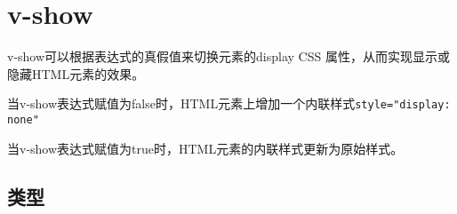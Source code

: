 \begin{lstlisting}[language=JavaScript]

\end{lstlisting}




\begin{lstlisting}[language=JavaScript]

\end{lstlisting}




\begin{lstlisting}[language=JavaScript]

\end{lstlisting}




\begin{lstlisting}[language=JavaScript]

\end{lstlisting}




\begin{lstlisting}[language=JavaScript]

\end{lstlisting}




\begin{lstlisting}[language=JavaScript]

\end{lstlisting}




\begin{lstlisting}[language=JavaScript]

\end{lstlisting}

\chapter{v-show}

v-show可以根据表达式的真假值来切换元素的display CSS 属性，从而实现显示或隐藏HTML元素的效果。

\begin{compactitem}
\item 当v-show表达式赋值为false时，HTML元素上增加一个内联样式\texttt{style="display: none"}
\item 当v-show表达式赋值为true时，HTML元素的内联样式更新为原始样式。
\end{compactitem}

\section{类型}

